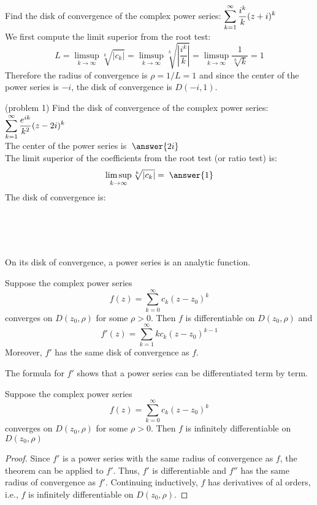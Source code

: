 \documentclass[handout]{ximera}
\begin{document}
\begin{example}[example 1]
Find the disk of convergence of the complex power series: $\displaystyle \sum_{k=1}^\infty \frac{i^k}{k}(z+i)^k$\\
We first compute the limit superior from the root test:
\[
L = \limsup_{k \to \infty} \sqrt[k]{|c_k|} = \limsup_{k \to \infty} \sqrt[k]{\left|\frac{i^k}{k}\right|} = \limsup_{k \to \infty} \frac{1}{\sqrt[k]{k}} = 1
\]
Therefore the radius of convergence is $\rho = 1/L = 1$ and since the center of the power series is $-i$, the disk of convergence is $D(-i, 1)$.
\end{example}

\begin{problem}(problem 1)
Find the disk of convergence of the complex power series: $\displaystyle \sum_{k=1}^\infty \frac{e^{ik}}{k^2}(z-2i)^k$\\
The center of the power series is $\; \answer{2i}$\\
The limit superior of the coefficients from the root test (or ratio test) is:
\[
\limsup_{k \to \infty} \sqrt[k]{|c_k|} = \; \answer{1}
\]
The disk of convergence is:
\begin{multipleChoice}
\\
\\
\\
\end{multipleChoice}
\end{problem}

On its disk of convergence, a power series is an analytic function.
\begin{theorem}
Suppose the complex power series
\[
f(z) = \sum_{k=0}^\infty c_k(z-z_0)^k
\]
converges on $D(z_0, \rho)$ for some $\rho > 0$.
Then $f$ is differentiable on $D(z_0, \rho)$ and 
\[
f'(z) = \sum_{k=1}^\infty kc_k(z-z_0)^{k-1}
\]
Moreover, $f'$ has the same disk of convergence as $f$.
\end{theorem}
\begin{remark}
The formula for $f'$ shows that a power series can be differentiated term by term.
\end{remark}
\begin{corollary}
Suppose the complex power series
\[
f(z) = \sum_{k=0}^\infty c_k(z-z_0)^k
\]
converges on $D(z_0, \rho)$ for some $\rho > 0$.
Then $f$ is infinitely differentiable on $D(z_0, \rho)$
\end{corollary}

\begin{proof}
Since $f'$ is a power series with the same radius of convergence as $f$, the theorem can be applied to $f'$. Thus,
$f'$ is differentiable and $f''$ has the same radius of convergence as $f'$. Continuing inductively, $f$
has derivatives of al orders, i.e., $f$ is infinitely differentiable on $D(z_0, \rho)$.
\end{proof}
\end{document}
